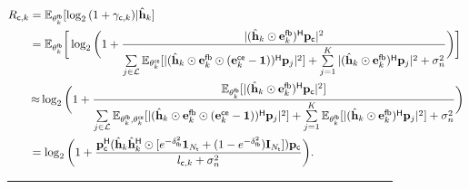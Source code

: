 \documentclass[draftclsnofoot, onecolumn, comsoc, 12pt]{IEEEtran}
\begin{document}
\begin{figure*}[!t]
\begin{align}
    \label{RCEq1}
    \small
    R_{{\sf{c}},k} &= \mathbb{E}_{\mathbf{\theta}_k^{\sf{fb}}} [\log_{2}{(1+\gamma_{{\sf{c}},k})}\vert\hat{\mathbf{h}}_k] \nonumber \\
    & = \mathbb{E}_{\mathbf{\theta}_k^{\sf{fb}}} \bigg[\log_{2} 
    \bigg(1 + \frac{\vert(\hat{\mathbf{h}}_{k} \odot \mathbf{e}_{k}^{\sf{fb}})^{\sf{H}} \mathbf{p}_{\sf{c}}\vert^{2}}{\sum\limits_{j \in \mathcal{L}}\mathbb{E}_{\mathbf{\theta}_k^{\sf{ce}}} [ \vert(\hat{\mathbf{h}}_{k} \odot \mathbf{e}_{k}^{\sf{fb}} \odot (\mathbf{e}_{k}^{\sf{ce}} - \mathbf{1}))^{\sf{H}} \mathbf{p}_{j}\vert^{2} ] + \sum\limits_{j=1}^{K} \vert (\hat{\mathbf{h}}_{k} \odot \mathbf{e}_{k}^{\sf{fb}})^{\sf{H}} \mathbf{p}_{j}\vert^{2} + \sigma_{n}^{2}}\bigg) \bigg] \nonumber \\
    & \, {\approx} \log_{2} 
    \bigg(1 + \frac{\mathbb{E}_{\mathbf{\theta}_k^{\sf{fb}}} [ \vert(\hat{\mathbf{h}}_{k} \odot \mathbf{e}_{k}^{\sf{fb}})^{\sf{H}} \mathbf{p}_{\sf{c}}\vert^{2} ] }{\sum\limits_{j \in \mathcal{L}}\mathbb{E}_{\mathbf{\theta}_k^{\sf{fb}}, \mathbf{\theta}_k^{\sf{ce}}} [ \vert(\hat{\mathbf{h}}_{k} \odot \mathbf{e}_{k}^{\sf{fb}} \odot (\mathbf{e}_{k}^{\sf{ce}} - \mathbf{1}))^{\sf{H}} \mathbf{p}_{j}\vert^{2} ] + \sum\limits_{j=1}^{K} \mathbb{E}_{\mathbf{\theta}_k^{\sf{fb}}} [\vert(\hat{\mathbf{h}}_{k} \odot \mathbf{e}_{k}^{\sf{fb}})^{\sf{H}} \mathbf{p}_{j}\vert^{2} ] + \sigma_{n}^{2}}\bigg) \nonumber \\
    &= \log_{2}
    \bigg(1+\frac{\mathbf{p}_{\sf{c}}^{\sf{H}}(\hat{\mathbf{h}}_{k} \hat{\mathbf{h}}_{k}^{\sf{H}} \odot
    [e^{-\delta_{\sf{fb}}^{2}}\mathbf{1}_{N_{{\sf{t}}}} + (1-e^{-\delta_{\sf{fb}}^{2}})\mathbf{I}_{N_{{\sf{t}}}}])\mathbf{p}_{\sf{c}}}
    {l_{{\sf{c}},k} + \sigma_{n}^{2}} \bigg).
\end{align}
\noindent\rule{\textwidth}{.05pt}%
\end{figure*}
\end{document}
